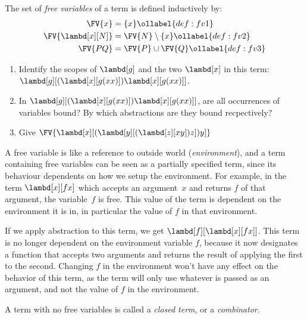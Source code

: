 \documentclass[../../../include/open-logic-section]{subfiles}
\begin{document}
\begin{defn} 
  The set of \emph{free variables} of a term is defined inductively by:
  \begin{align} 
    \FV{x} &= \{x\} \ollabel{def:fv1} \\
    \FV{\lambd[x][N]} &= \FV{N} \setminus \{x\}    \ollabel{def:fv2} \\
    \FV{PQ} &= \FV{P} \cup \FV{Q} \ollabel{def:fv3}
  \end{align}
\end{defn}

\begin{prob}
  \begin{enumerate}
  \item Identify the scopes of $\lambd[g]$ and the two $\lambd[x]$ in
    this term: $\lambd[g][(\lambd[x][g (x x)]) \lambd[x][g (x x)]]$.
  \item In $\lambd[g][(\lambd[x][g (x x)]) \lambd[x][g (x x)]]$, are
    all occurrences of variables bound? By which abstractions are they
    bound recpectively?
    \item Give $\FV{\lambd[x][(\lambd[y][(\lambd[z][x y]) z]) y]}$
  \end{enumerate}
\end{prob}

\begin{explain}
A free variable is like a reference to outside world
(\emph{environment}), and a term containing free variables can be seen
as a partially specified term, since its behaviour dependents on how
we setup the environment. For example, in the term $\lambd[x][f x]$
which accepts an argument~$x$ and returns $f$ of that argument, the
variable~$f$ is free. This value of the term is dependent on the
environment it is in, in particular the value of $f$ in that
environment.

If we apply abstraction to this term, we get $\lambd[f][\lambd[x][f
    x]]$. This term is no longer dependent on the environment variable
$f$, because it now designates a function that accepts two arguments
and returns the result of applying the first to the second. Changing
$f$ in the environment won't have any effect on the behavior of this
term, as the term will only use whatever is passed as an argument, and
not the value of $f$ in the environment.
\end{explain}

\begin{defn}
  A term with no free variables is called a \emph{closed term}, or a
  \emph{combinator}.
\end{defn}
\end{document}
